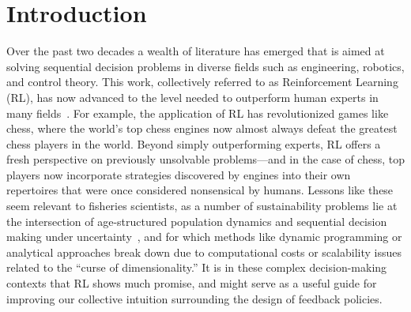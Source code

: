 \documentclass[floatfix,nofootinbib,longbibliography,notitlepage]{revtex4-1}
\begin{document}
\maketitle

\tableofcontents
\makeatletter
\let\toc@pre\relax
\let\toc@post\relax
\makeatother 

%
%
%
\section{Introduction}

Over the past two decades a wealth of literature has emerged that is aimed at solving sequential decision problems in diverse fields such as engineering, robotics, and control theory.  
This work, collectively referred to as Reinforcement Learning (RL), has now advanced to the level needed to outperform human experts in many fields~\cite{sutton-rl,bertsekas-rl}.  
For example, the application of RL has revolutionized games like chess, where the world’s top chess engines now almost always defeat the greatest chess players in the world. 
Beyond simply outperforming experts, RL offers a fresh perspective on previously unsolvable problems—and in the case of chess, top players now incorporate strategies discovered by engines into their own repertoires that were once considered nonsensical by humans. 
Lessons like these seem relevant to fisheries scientists, as a number of sustainability problems lie at the intersection of age-structured population dynamics and sequential decision making under uncertainty~\cite{walters-hilborn-1978}, and for which methods like dynamic programming or analytical approaches break down due to computational costs or scalability issues related to the “curse of dimensionality.”  
It is in these complex decision-making contexts that RL shows much promise, and might serve as a useful guide for improving our collective intuition surrounding the design of feedback policies.
\end{document}
